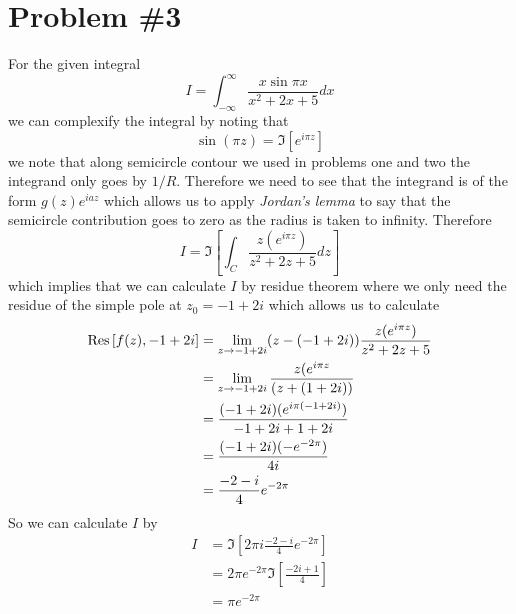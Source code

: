 \documentclass[11pt]{article}
\numberwithin{equation}{section}
\begin{document}
\section{Problem \#3}
For the given integral 
$$I = \int_{-\infty}^{\infty}\frac{x\sin\pi{x}}{x^2+2x+5}dx$$
we can complexify the integral by noting that
$$\sin(\pi{z}) = \Im[e^{i\pi{z}}]$$
we note that along semicircle contour we used in problems one and two the integrand only goes
by $1/R$. Therefore we need to see that the integrand is of the form $g(z)e^{iaz}$ which
allows us to apply \emph{Jordan's lemma} to say that the semicircle contribution goes to zero
as the radius is taken to infinity. Therefore 
$$I = \Im\left[\int_{C}\frac{z(e^{i\pi{z}})}{z^2+2z+5}dz\right]$$
which implies that we can calculate $I$ by residue theorem where we only need the residue of
the simple pole at $z_0=-1+2i$ which allows us to calculate
\begin{align*}
\textnormal{Res}\left[{f(z)},{-1+2i}\right] &= \lim_{z\rightarrow{-1+2i}}(z-(-1+2i))\frac{z(e^{i\pi{z}})}{z^2+2z+5}\\
&= \lim_{z\rightarrow{-1+2i}}\frac{z(e^{i\pi{z}}}{(z+(1+2i))}\\
&= \frac{(-1+2i)(e^{i\pi{(-1+2i)}})}{-1+2i+1+2i}\\
&= \frac{(-1+2i)(-e^{-2\pi})}{4i}\\
&= \frac{-2-i}{4}e^{-2\pi}
\end{align*}
So we can calculate $I$ by
\begin{align*}
I &= \Im[2\pi{i}\frac{-2-i}{4}e^{-2\pi}]\\
 &= 2\pi e^{-2\pi}\Im[\frac{-2i+1}{4}]\\
 &= \pi e^{-2\pi}
\end{align*}

\pagebreak
\end{document}
